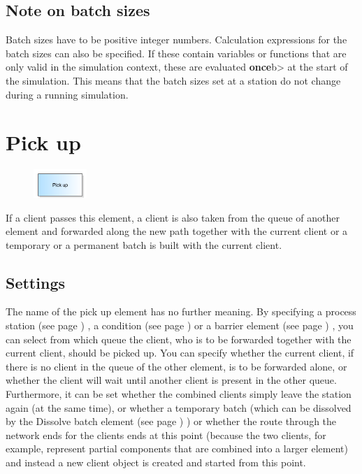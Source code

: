 \subsection*{Note on batch sizes}

Batch sizes have to be positive integer numbers.
Calculation expressions for the batch sizes can also be specified.
If these contain variables or functions that are only valid in the simulation context, these are evaluated \textbf{once}b> at the start of the simulation.
This means that the batch sizes set at a station do not change during a running simulation.


\section{Pick up}
\label{ref:ModelElementPickUp}

\begin{figure}
\vspace{-22pt}
\includegraphics[width=2cm]{imageModelElementPickUp.png}
\vspace{-22pt}
\end{figure}

If a client passes this element, a client is also taken from the queue of another element and forwarded
along the new path together with the current client or a temporary or a permanent batch is built with the
current client.

\subsection*{Settings}

The name of the pick up element has no further meaning. By specifying a
process station (see page \pageref{ref:ModelElementProcess}) , a condition (see page \pageref{ref:ModelElementHold}) 
or a barrier element (see page \pageref{ref:ModelElementBarrier}) , you can select from which queue the client,
who is to be forwarded together with the current client, should be picked up. You can specify whether
the current client, if there is no client in the queue of the other element, is to be forwarded alone, or
whether the client will wait until another client is present in the other queue. Furthermore, it can be set whether
the combined clients simply leave the station again (at the same time), or whether a temporary batch (which
can be dissolved by the Dissolve batch element (see page \pageref{ref:ModelElementSeparate}) ) or whether the route
through the network ends for the clients ends at this point (because the two clients, for example, represent
partial components that are combined into a larger element) and instead a new client object is created and
started from this point.


